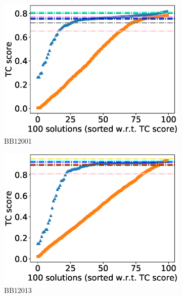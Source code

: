 \begin{figure}[!htbp]
	\centering
	\begin{adjustwidth}{-1cm}{-1cm}
		\begin{subfigure}{0.22\textwidth}
			\includegraphics[width=\columnwidth]{Figure/summary/precomputedInit/Balibase/BB12001_tc_density_single_run_2}
			\caption{BB12001}
		\end{subfigure}	
		\begin{subfigure}{0.22\textwidth}
			\includegraphics[width=\columnwidth]{Figure/summary/precomputedInit/Balibase/BB12013_tc_density_single_run_2}
			\caption{BB12013}
		\end{subfigure}
		\begin{subfigure}{0.22\textwidth}

\end{subfigure}
\end{adjustwidth}
\end{figure}
